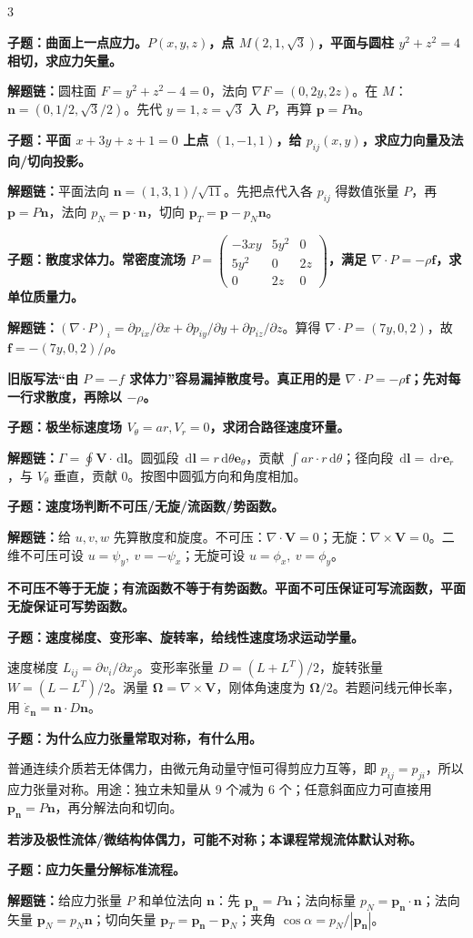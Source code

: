 \documentclass[a4paper]{article}
\newcommand{\qt}[1]{\vspace{0.04pt}\colorbox{Q}{\parbox{\dimexpr\linewidth-2\fboxsep}{\color{white}\bfseries #1}}\par}
\newcommand{\ans}[1]{\colorbox{G}{\parbox{\dimexpr\linewidth-2\fboxsep}{#1}}\par}
\newcommand{\warn}[1]{\colorbox{Y}{\parbox{\dimexpr\linewidth-2\fboxsep}{\color{E}\bfseries #1}}\par}
\newcommand{\chain}[1]{{\color{A}\bfseries 解题链：}#1\par}
\newcommand{\dd}{\,\mathrm d}
\begin{document}
\begin{multicols}{3}
\qt{子题：曲面上一点应力。$P(x,y,z)$，点 $M(2,1,\sqrt3)$，平面与圆柱 $y^2+z^2=4$ 相切，求应力矢量。}
\chain{圆柱面 $F=y^2+z^2-4=0$，法向 $\nabla F=(0,2y,2z)$。在 $M$：$\bm n=(0,1/2,\sqrt3/2)$。先代 $y=1,z=\sqrt3$ 入 $P$，再算 $\bm p=P\bm n$。}

\qt{子题：平面 $x+3y+z+1=0$ 上点 $(1,-1,1)$，给 $p_{ij}(x,y)$，求应力向量及法向/切向投影。}
\chain{平面法向 $\bm n=(1,3,1)/\sqrt{11}$。先把点代入各 $p_{ij}$ 得数值张量 $P$，再 $\bm p=P\bm n$，法向 $p_N=\bm p\cdot\bm n$，切向 $\bm p_T=\bm p-p_N\bm n$。}

\qt{子题：散度求体力。常密度流场 $P=\begin{pmatrix}-3xy&5y^2&0\\5y^2&0&2z\\0&2z&0\end{pmatrix}$，满足 $\nabla\cdot P=-\rho\bm f$，求单位质量力。}
\chain{$(\nabla\cdot P)_i=\partial p_{ix}/\partial x+\partial p_{iy}/\partial y+\partial p_{iz}/\partial z$。算得 $\nabla\cdot P=(7y,0,2)$，故 $\bm f=-(7y,0,2)/\rho$。}
\warn{旧版写法“由 $P=-f$ 求体力”容易漏掉散度号。真正用的是 $\nabla\cdot P=-\rho\bm f$；先对每一行求散度，再除以 $-\rho$。}

\qt{子题：极坐标速度场 $V_\theta=ar,V_r=0$，求闭合路径速度环量。}
\chain{$\Gamma=\oint\bm V\cdot\dd\bm l$。圆弧段 $\dd\bm l=r\dd\theta\bm e_\theta$，贡献 $\int ar\cdot r\dd\theta$；径向段 $\dd\bm l=\dd r\bm e_r$，与 $V_\theta$ 垂直，贡献 0。按图中圆弧方向和角度相加。}

\qt{子题：速度场判断不可压/无旋/流函数/势函数。}
\chain{给 $u,v,w$ 先算散度和旋度。不可压：$\nabla\cdot\bm V=0$；无旋：$\nabla\times\bm V=0$。二维不可压可设 $u=\psi_y,\ v=-\psi_x$；无旋可设 $u=\phi_x,\ v=\phi_y$。}
\warn{不可压不等于无旋；有流函数不等于有势函数。平面不可压保证可写流函数，平面无旋保证可写势函数。}

\qt{子题：速度梯度、变形率、旋转率，给线性速度场求运动学量。}
\ans{速度梯度 $L_{ij}=\partial v_i/\partial x_j$。变形率张量 $D=(L+L^T)/2$，旋转张量 $W=(L-L^T)/2$。涡量 $\bm\Omega=\nabla\times\bm V$，刚体角速度为 $\bm\Omega/2$。若题问线元伸长率，用 $\dot\varepsilon_{\bm n}=\bm n\cdot D\bm n$。}

\qt{子题：为什么应力张量常取对称，有什么用。}
\ans{普通连续介质若无体偶力，由微元角动量守恒可得剪应力互等，即 $p_{ij}=p_{ji}$，所以应力张量对称。用途：独立未知量从 9 个减为 6 个；任意斜面应力可直接用 $\bm p_{\bm n}=P\bm n$，再分解法向和切向。}
\warn{若涉及极性流体/微结构体偶力，可能不对称；本课程常规流体默认对称。}

\qt{子题：应力矢量分解标准流程。}
\chain{给应力张量 $P$ 和单位法向 $\bm n$：先 $\bm p_{\bm n}=P\bm n$；法向标量 $p_N=\bm p_{\bm n}\cdot\bm n$；法向矢量 $\bm p_N=p_N\bm n$；切向矢量 $\bm p_T=\bm p_{\bm n}-\bm p_N$；夹角 $\cos\alpha=p_N/|\bm p_{\bm n}|$。}



\end{multicols}
\end{document}

